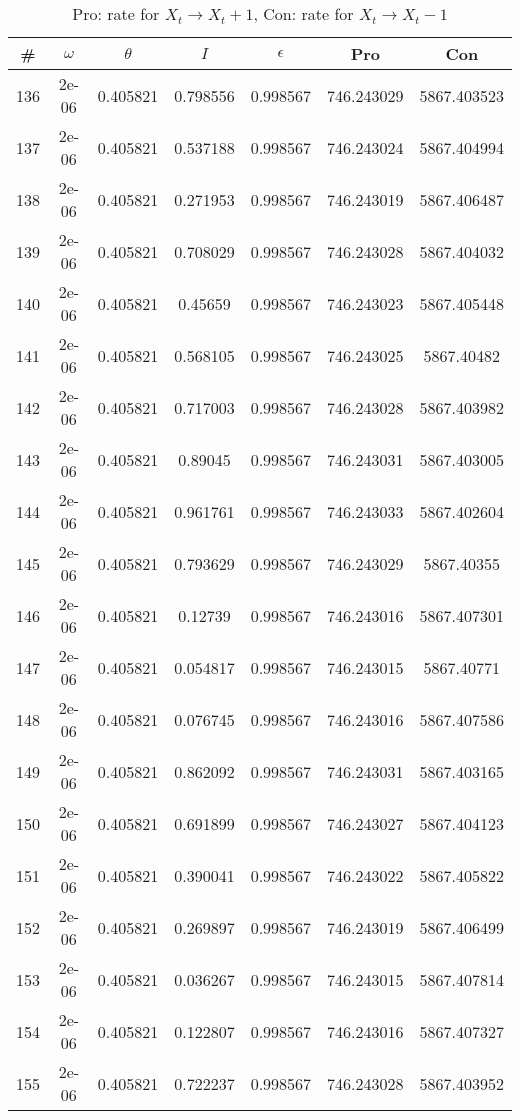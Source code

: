\newpage
\begin{table}
\caption{Pro: rate for $X_t \rightarrow X_t + 1$, Con: rate for $X_t \rightarrow X_t - 1$}
\begin{tabular*}{\linewidth}{c|c|c|c|c|c|c}
\# & $\omega$ & $\theta$ & $I$ & $\epsilon$ & Pro & Con \\
\hline
136 & 2e-06 & 0.405821 & 0.798556 & 0.998567 & 746.243029 & 5867.403523\\
137 & 2e-06 & 0.405821 & 0.537188 & 0.998567 & 746.243024 & 5867.404994\\
138 & 2e-06 & 0.405821 & 0.271953 & 0.998567 & 746.243019 & 5867.406487\\
139 & 2e-06 & 0.405821 & 0.708029 & 0.998567 & 746.243028 & 5867.404032\\
140 & 2e-06 & 0.405821 & 0.45659 & 0.998567 & 746.243023 & 5867.405448\\
141 & 2e-06 & 0.405821 & 0.568105 & 0.998567 & 746.243025 & 5867.40482\\
142 & 2e-06 & 0.405821 & 0.717003 & 0.998567 & 746.243028 & 5867.403982\\
143 & 2e-06 & 0.405821 & 0.89045 & 0.998567 & 746.243031 & 5867.403005\\
144 & 2e-06 & 0.405821 & 0.961761 & 0.998567 & 746.243033 & 5867.402604\\
145 & 2e-06 & 0.405821 & 0.793629 & 0.998567 & 746.243029 & 5867.40355\\
146 & 2e-06 & 0.405821 & 0.12739 & 0.998567 & 746.243016 & 5867.407301\\
147 & 2e-06 & 0.405821 & 0.054817 & 0.998567 & 746.243015 & 5867.40771\\
148 & 2e-06 & 0.405821 & 0.076745 & 0.998567 & 746.243016 & 5867.407586\\
149 & 2e-06 & 0.405821 & 0.862092 & 0.998567 & 746.243031 & 5867.403165\\
150 & 2e-06 & 0.405821 & 0.691899 & 0.998567 & 746.243027 & 5867.404123\\
151 & 2e-06 & 0.405821 & 0.390041 & 0.998567 & 746.243022 & 5867.405822\\
152 & 2e-06 & 0.405821 & 0.269897 & 0.998567 & 746.243019 & 5867.406499\\
153 & 2e-06 & 0.405821 & 0.036267 & 0.998567 & 746.243015 & 5867.407814\\
154 & 2e-06 & 0.405821 & 0.122807 & 0.998567 & 746.243016 & 5867.407327\\
155 & 2e-06 & 0.405821 & 0.722237 & 0.998567 & 746.243028 & 5867.403952\\

\end{tabular*}
\end{table}
